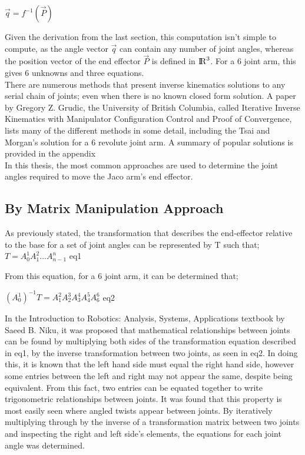 \documentclass[12pt,openany,a4paper]{book}
\begin{document}
$\vec{q} = f^{-1}( \vec{P} )$

Given the derivation from the last section, this computation isn't simple to compute, as the angle vector $\vec{q}$ can contain any number of joint angles, whereas the position vector of the end effector $\vec{P}$ is defined in ${\rm I\!R}^3$. For a 6 joint arm, this gives 6 unknowns and three equations.\\

There are numerous methods that present inverse kinematics solutions to any serial chain of joints; even when there is no known closed form solution. A paper by Gregory Z. Grudic, the University of British Columbia, called Iterative Inverse Kinematics with Manipulator Configuration Control and Proof of Convergence, lists many of the different methods in some detail, including the Tsai and Morgan's solution for a 6 revolute joint arm. A summary of popular solutions is provided in the appendix\\

In this thesis, the most common approaches are used to determine the joint angles required to move the Jaco arm's end effector. %

\subsection{By Matrix Manipulation Approach}
As previously stated, the transformation that describes the end-effector relative to the base for a set of joint angles can be represented by T such that;
 $T = A_{0}^{1} A_{1}^{2} ... A_{n-1}^n$	eq1
 
From this equation, for a 6 joint arm, it can be determined that;
 
$(A_{0}^{1})^{-1} T = A_{1}^{2} A_{2}^{3} A_{3}^{4} A_{4}^{5} A_{6}^{6}$ eq2

In the Introduction to Robotics: Analysis, Systems, Applications textbook by Saeed B. Niku, it was proposed that mathematical relationships between joints can be found by multiplying both sides of the transformation equation described in eq1, by the inverse transformation between two joints, as seen in eq2. In doing this, it is known that the left hand side must equal the right hand side, however some entries between the left and right may not appear the same, despite being equivalent. From this fact, two entries can be equated together to write trigonometric relationships between joints. It was found that this property is most easily seen where angled twists appear between joints. By iteratively multiplying through by the inverse of a transformation matrix between two joints and inspecting the right and left side's elements, the equations for each joint angle was determined. 
\end{document}
